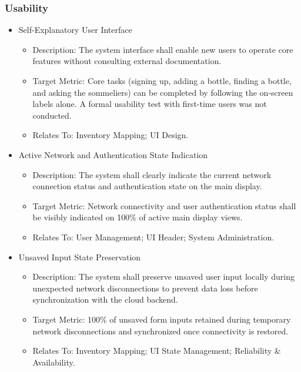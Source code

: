 \documentclass[conference]{IEEEtran}
\begin{document}
\subsubsection{Usability}
\begin{itemize}
    \item Self-Explanatory User Interface
    \begin{itemize}
        \item Description: The system interface shall enable new users to operate core features without consulting external documentation.
        \item Target Metric: Core tasks (signing up, adding a bottle, finding a bottle, and asking the sommeliers) can be completed by following the on-screen labels alone. A formal usability test with first-time users was not conducted.
        \item Relates To: Inventory Mapping; UI Design.
    \end{itemize}

    \item Active Network and Authentication State Indication
    \begin{itemize}
        \item Description: The system shall clearly indicate the current network connection status and authentication state on the main display.
        \item Target Metric: Network connectivity and user authentication status shall be visibly indicated on 100\% of active main display views.
        \item Relates To: User Management; UI Header; System Administration.
    \end{itemize}

    \item Unsaved Input State Preservation
    \begin{itemize}
        \item Description: The system shall preserve unsaved user input locally during unexpected network disconnections to prevent data loss before synchronization with the cloud backend.
        \item Target Metric: 100\% of unsaved form inputs retained during temporary network disconnections and synchronized once connectivity is restored.
        \item Relates To: Inventory Mapping; UI State Management; Reliability \& Availability.
    \end{itemize}
\end{itemize}
\end{document}
